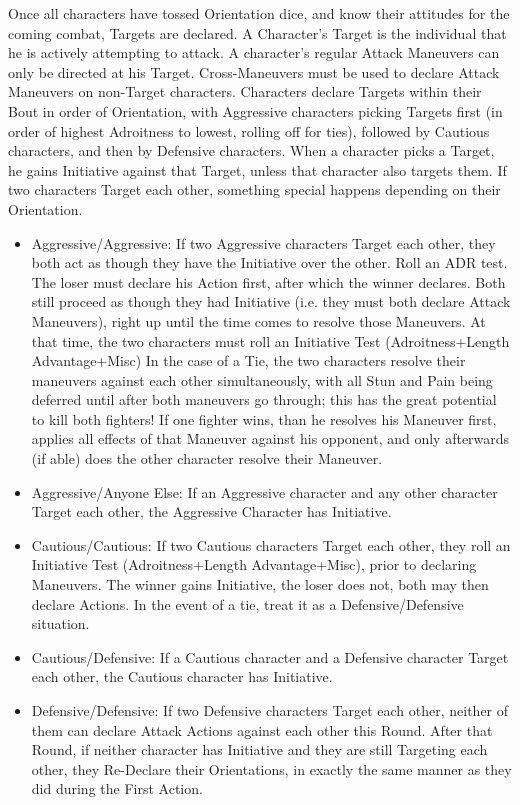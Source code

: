 \documentclass[oneside,11pt,english]{book}
\begin{document}
Once all characters have tossed Orientation dice, and know their attitudes for the coming combat, 
Targets are declared. 
A Character’s Target is the individual that he is actively attempting to attack. A character’s 
regular Attack Maneuvers can only be directed at his Target. Cross-Maneuvers must be used to 
declare Attack Maneuvers on non-Target characters. 
Characters declare Targets within their Bout in order of Orientation, with Aggressive characters 
picking Targets first (in order of highest Adroitness to lowest, rolling off for ties), followed by 
Cautious characters, and then by Defensive characters. 
When a character picks a Target, he gains Initiative against that Target, unless that character also 
targets them. If two characters Target each other, something special happens depending on their 
Orientation. 


 
\begin{itemize}
\item Aggressive/Aggressive: If two Aggressive characters Target each other, they both act as 
though they have the Initiative over the other. Roll an ADR test. The loser must declare 
his Action first, after which the winner declares. Both still proceed as though they had 
Initiative (i.e. they must both declare Attack Maneuvers), right up until the time comes to 
resolve those Maneuvers. At that time, the two characters must roll an Initiative Test 
(Adroitness+Length Advantage+Misc) In the case of a Tie, the two characters resolve 
their maneuvers against each other simultaneously, with all Stun and Pain being deferred 
until after both maneuvers go through; this has the great potential to kill both fighters! If 
one fighter wins, than he resolves his Maneuver first, applies all effects of that Maneuver 
against his opponent, and only afterwards (if able) does the other character resolve their 
Maneuver. 
\item Aggressive/Anyone Else: If an Aggressive character and any other character Target each 
other, the Aggressive Character has Initiative. 
\item Cautious/Cautious: If two Cautious characters Target each other, they roll an Initiative 
Test (Adroitness+Length Advantage+Misc), prior to declaring Maneuvers. The winner 
gains Initiative, the loser does not, both may then declare Actions. In the event of a tie, 
treat it as a Defensive/Defensive situation. 
\item Cautious/Defensive: If a Cautious character and a Defensive character Target each other, 
the Cautious character has Initiative. 
\item Defensive/Defensive: If two Defensive characters Target each other, neither of them can 
declare Attack Actions against each other this Round. After that Round, if neither 
character has Initiative and they are still Targeting each other, they Re-Declare their 
Orientations, in exactly the same manner as they did during the First Action. 
\end{itemize}
 
\end{document}

